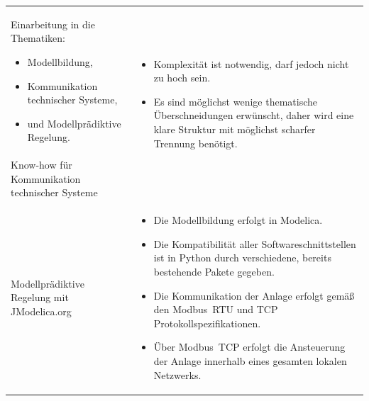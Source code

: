 \begin{table}[H]
\begin{tabularx}{1\textwidth}{m{}m{}}
Einarbeitung in die Thematiken:
\begin{minipage}[t]{0.34\textwidth}
\begin{itemize}[itemsep=0pt,topsep=0pt,leftmargin=4mm]
	\item Modellbildung,
	\item Kommunikation technischer \newline Systeme,
	\item und Modellprädiktive \newline Regelung.
\end{itemize}
\end{minipage}
 	& \multirow{2}{\hsize}{
\begin{minipage}[t]{0.57\textwidth}
\begin{itemize}[itemsep=0pt,topsep=0pt,leftmargin=5mm]
	\item Komplexität ist notwendig, darf jedoch nicht zu hoch sein.
	\item Es sind möglichst wenige thematische Überschneidungen erwünscht, daher wird eine klare Struktur mit möglichst scharfer Trennung benötigt.
\end{itemize}
\end{minipage}
}  \\

\cmidrule[0.1pt](lr{2em}){1-1} 

Know-how für Kommunikation \newline technischer Systeme 	&		\\


\cmidrule[0.5pt](r{0.25em}){1-1} 
\cmidrule[0.5pt](l{0.25em}){2-2}

\addlinespace[4mm] Modellprädiktive Regelung mit JModelica.org \newline & \multirow{3}{\hsize}{
\begin{minipage}[t]{0.57\textwidth}
\begin{itemize}[itemsep=0pt,topsep=0pt,leftmargin=5mm]
\item Die Modellbildung erfolgt in Modelica.
\item Die Kompatibilität aller Softwareschnittstellen ist in Python durch verschiedene, bereits bestehende Pakete gegeben.
\item Die Kommunikation der Anlage erfolgt gemäß den Modbus~RTU und TCP Protokollspezifikationen.
\item Über Modbus~TCP erfolgt die Ansteuerung der Anlage innerhalb eines gesamten lokalen Netzwerks.
\end{itemize}
\end{minipage}
}  \\


\end{tabularx}
\end{table}
